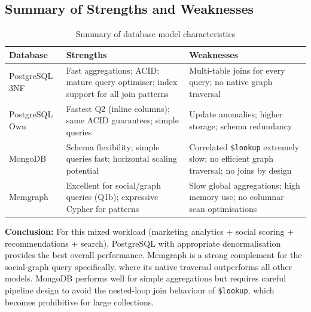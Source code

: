 \documentclass[12pt,a4paper]{article}
\begin{document}
\subsection{Summary of Strengths and Weaknesses}

\begin{table}[H]
\centering
\small
\begin{tabularx}{\linewidth}{lXX}
\toprule
\textbf{Database} & \textbf{Strengths} & \textbf{Weaknesses} \\
\midrule
PostgreSQL 3NF &
  Fast aggregations; ACID; mature query optimiser; index support for all join patterns &
  Multi-table joins for every query; no native graph traversal \\
\midrule
PostgreSQL Own &
  Fastest Q2 (inline columns); same ACID guarantees; simple queries &
  Update anomalies; higher storage; schema redundancy \\
\midrule
MongoDB &
  Schema flexibility; simple queries fast; horizontal scaling potential &
  Correlated \texttt{\$lookup} extremely slow; no efficient graph traversal; no joins by design \\
\midrule
Memgraph &
  Excellent for social/graph queries (Q1b); expressive Cypher for patterns &
  Slow global aggregations; high memory use; no columnar scan optimisations \\
\bottomrule
\end{tabularx}
\caption{Summary of database model characteristics}
\end{table}

\textbf{Conclusion:} For this mixed workload (marketing analytics + social
scoring + recommendations + search), PostgreSQL with appropriate denormalisation
provides the best overall performance. Memgraph is a strong complement for
the social-graph query specifically, where its native traversal outperforms
all other models. MongoDB performs well for simple aggregations but requires
careful pipeline design to avoid the nested-loop join behaviour of
\texttt{\$lookup}, which becomes prohibitive for large collections.
\end{document}
